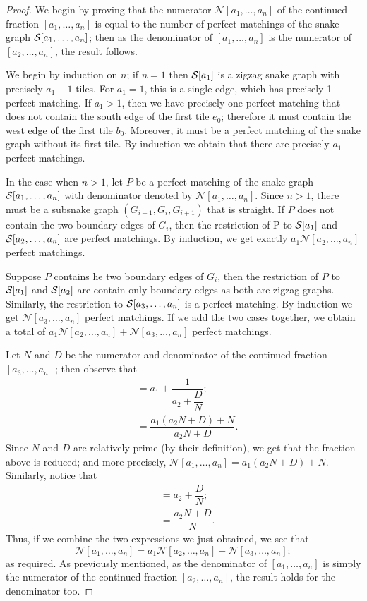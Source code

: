 \begin{proof}
    We begin by proving that the numerator $\mathcal{N}[a_1,\dots,a_n]$ of the continued fraction $[a_1,\dots,a_n]$ is equal to the number of perfect matchings of the snake graph $\mathcal{S}[a_1,\dots,a_n]$; then as the denominator of $[a_1,\dots,a_n]$ is the numerator of $[a_2,\dots,a_n]$, the result follows.

    We begin by induction on $n$; if $n=1$ then $\mathcal{S}[a_1]$ is a zigzag snake graph with precisely $a_1-1$ tiles. For $a_1 = 1$, this is a single edge, which has precisely 1 perfect matching. If $a_1 > 1$, then we have precisely one perfect matching that does not contain the south edge of the first tile $e_0$; therefore it must contain the west edge of the first tile $b_0$. Moreover, it must be a perfect matching of the snake graph without its first tile. By induction we obtain that there are precisely $a_1$ perfect matchings. 

    In the case when $n>1$, let $P$ be a perfect matching of the snake graph $\mathcal{S}[a_1,\dots,a_n]$ with denominator denoted by $\mathcal{N}[a_1,\dots,a_n]$. Since $n>1$, there must be a subsnake graph $(G_{i-1},G_i,G_{i+1})$ that is straight. If $P$ does not contain the two boundary edges of $G_i$, then the restriction of P to $\mathcal{S}[a_1]$ and $\mathcal{S}[a_2,\dots,a_n]$ are perfect matchings. By induction, we get exactly $a_1\mathcal{N}[a_2,\dots,a_n]$ perfect matchings. 

    Suppose $P$ contains he two boundary edges of $G_i$, then the restriction of $P$ to $\mathcal{S}[a_1]$ and $\mathcal{S}[a_2]$ are contain only boundary edges as both are zigzag graphs. Similarly, the restriction to $\mathcal{S}[a_3,\dots,a_n]$ is a perfect matching. By induction we get $\mathcal{N}[a_3,
    \dots,a_n]$ perfect matchings. If we add the two cases together, we obtain a total of $a_1\mathcal{N}[a_2,\dots,a_n] + \mathcal{N}[a_3,\dots,a_n]$ perfect matchings.

    Let $N$ and $D$ be the numerator and denominator of the continued fraction $[a_3,\dots,a_n]$; then observe that 
    \begin{align*}
        [a_1,\dots,a_n] &= a_1 + \dfrac{1}{a_2 + \dfrac{D}{N}}; \\
        &= \dfrac{a_1(a_2N + D) + N}{a_2N + D}.
    \end{align*}
    Since $N$ and $D$ are relatively prime (by their definition), we get that the fraction above is reduced; and more precisely, $\mathcal{N}[a_1,\dots,a_n] = a_1(a_2N+D) + N$. Similarly, notice that 
    \begin{align*}
        [a_2,\dots,a_n] &= a_2 + \dfrac{D}{N};\\
        &= \dfrac{a_2N + D}{N}.
    \end{align*}
    Thus, if we combine the two expressions we just obtained, we see that 
    \begin{equation*}
        \mathcal{N}[a_1,\dots,a_n] = a_1\mathcal{N}[a_2,\dots,a_n] + \mathcal{N}[a_3,\dots,a_n];
    \end{equation*}
    as required. As previously mentioned, as the denominator of $[a_1,\dots,a_n]$ is simply the numerator of the continued fraction $[a_2,\dots,a_n]$, the result holds for the denominator too.
\end{proof}
